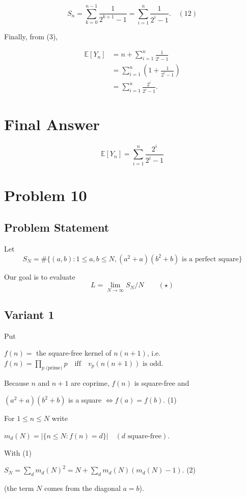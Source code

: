 \documentclass[12pt,a4paper]{article}
\theoremstyle{definition}
\begin{document}
\[
S_n = \sum_{k=0}^{n-1} \frac{1}{2^{k+1} - 1} = \sum_{i=1}^{n} \frac{1}{2^i - 1}. \quad {(12)}
\]

Finally, from (3),

\begin{align}
\mathbb{E}[Y_n] &= n + \sum_{i=1}^{n} \frac{1}{2^i - 1} \\
&= \sum_{i=1}^{n} \left(1 + \frac{1}{2^i - 1}\right) \\
&= \sum_{i=1}^{n} \frac{2^i}{2^i - 1}. \tag{13}
\end{align}

\section*{Final Answer}

\[
\boxed{\displaystyle\mathbb{E}[Y_n] = \sum_{i=1}^{n} \frac{2^i}{2^i - 1}}
\]

\section{Problem 10}

\subsection*{Problem Statement}
Let
\[S_N = \#\{(a , b) : 1 \leq a , b \leq N , (a^2+a)(b^2+b) \text{ is a perfect square}\}\]

Our goal is to evaluate
\[L = \lim_{N\to\infty} S_N / N \qquad (\star)\]

\subsection{Variant 1}
    Put

    $f(n) = $ the square-free kernel of $n(n+1)$, i.e.
    $f(n) = \prod_{p \text{ (prime)}} p \quad \text{iff} \quad v_p(n(n+1)) \text{ is odd}$.

    Because $n$ and $n+1$ are coprime, $f(n)$ is square-free and

    $(a^2+a)(b^2+b)$ is a square $\iff f(a) = f(b)$. \qquad (1)

    For $1 \leq n \leq N$ write

    $m_d(N) = |\{n \leq N : f(n) = d\}| \quad (d \text{ square-free})$.

    With (1)

    $S_N = \sum_d m_d(N)^2 = N + \sum_d m_d(N)(m_d(N)-1)$. \qquad (2)

    (the term $N$ comes from the diagonal $a = b$).
\end{document}
